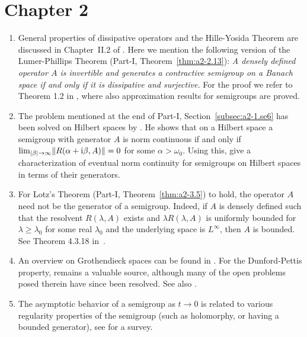 \begin{enumerate}
\end{enumerate}
\section*{Chapter 2}
\begin{enumerate} 
\item
General properties of dissipative operators and the Hille-Yosida Theorem are discussed in Chapter~II.2 of \textcite{zbmath01354832}. 
Here we mention the following version of the Lumer-Phillips Theorem (Part-I, Theorem~\ref{thm:a2-2.13}):  
\textit{A densely defined operator $A$ is invertible and generates a contractive semigroup on a Banach space if and only if it is dissipative and surjective.} 
For the proof we refer to Theorem 1.2 in \textcite{zbmath07950102}, where also approximation results for semigroups are proved.

\item 
The problem mentioned at the end of Part-I, Section~\ref{subsec:a2-1.se6} has been solved on Hilbert spaces by \textcite{zbmath00126068}. 
He shows that on a Hilbert space a semigroup with generator  $A$ is norm continuous if and only if
$\lim_{\lvert \beta \rvert \to \infty} \lVert R(\alpha + \mathrm{i}\beta, A) \rVert = 0$  for some $\alpha > \omega_0$.
Using this, \textcite{zbmath00701021} give a characterization of eventual norm continuity for semigroups on Hilbert spaces in terms of their generators.

\item
For Lotz's Theorem (Part-I, Theorem~\ref{thm:a2-3.5}) to hold, the operator $A$ need not be the generator of a semigroup. 
Indeed, if $A$ is densely defined such that the resolvent $R(\lambda,A)$ exists and $\lambda R(\lambda,A)$ is uniformly bounded for $\lambda \geq \lambda_0$ for some real $\lambda_0$ and the underlying space is $L^\infty$, then  $A$ is bounded. See Theorem 4.3.18 in~\textcite{zbmath05842872}.

\item
An overview on Grothendieck spaces can be found in \textcite{zbmath07458830}.
For the Dunford-Pettis property,  \textcite{zbmath03911038} remains a valuable source, although many of the open problems posed therein have since been resolved. 
See also \textcite{zbmath00769497}.

\item 
The asymptotic behavior of a semigroup as 
$t \rightarrow 0$ is related to various regularity properties of the semigroup (such as holomorphy, or having a bounded generator), see \textcite{zbmath06571398}  for a survey.

\end{enumerate}
